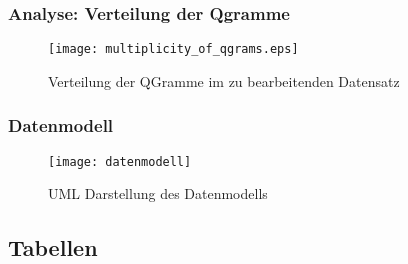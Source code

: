 \subsubsection{Analyse: Verteilung der Qgramme}
\begin{figure}[!htp]
    \caption{Verteilung der QGramme im zu bearbeitenden Datensatz}
    \label{fig:qgram_verteilung}
    \texttt{[image: multiplicity\_of\_qgrams.eps]}
    \centering
\end{figure}

\subsubsection{Datenmodell}
\begin{figure}[!htp]
    \caption{UML Darstellung des Datenmodells}
    \label{fig:datenmodell}
    \texttt{[image: datenmodell]}
    \centering
\end{figure}



\subsection{Tabellen}

